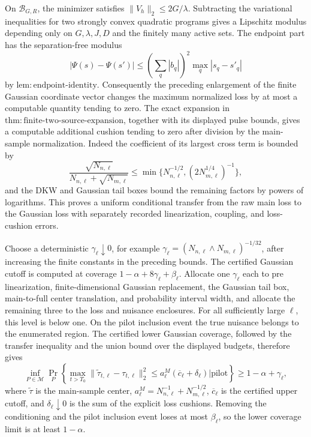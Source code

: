 On \(\mathcal B_{G,R}\), the minimizer satisfies
\(\|V_h\|_2\leq2G/\lambda\).  Subtracting the variational inequalities for two strongly convex quadratic programs gives a Lipschitz modulus depending only on \(G,\lambda,J,D\) and the finitely many active sets.  The endpoint part has the separation-free modulus
\[
 |\Psi(s)-\Psi(s')|
 \leq\left(\sum_q|b_q|\right)^2\max_q|s_q-s'_q|
\]
by \(\mathrm{lem:endpoint\mbox{-}identity}\).  Consequently the preceding enlargement of the finite Gaussian coordinate vector changes the maximum normalized loss by at most a computable quantity tending to zero.  The exact expansion in \(\mathrm{thm:finite\mbox{-}two\mbox{-}source\mbox{-}expansion}\), together with its displayed pulse bounds, gives a computable additional cushion tending to zero after division by the main-sample normalization.  Indeed the coefficient of its largest cross term is bounded by
\[
 \frac{\sqrt{N_{n,\ell}}}
 {N_{n,\ell}+\sqrt{N_{m,\ell}}}
 \leq \min\{N_{n,\ell}^{-1/2},(2N_{m,\ell}^{1/4})^{-1}\},
\]
and the DKW and Gaussian tail boxes bound the remaining factors by powers of logarithms.  This proves a uniform conditional transfer from the raw main loss to the Gaussian loss with separately recorded linearization, coupling, and loss-cushion errors.

Choose a deterministic \(\gamma_\ell\downarrow0\), for example
\(\gamma_\ell=(N_{n,\ell}\wedge N_{m,\ell})^{-1/32}\), after increasing the finite constants in the preceding bounds.  The certified Gaussian cutoff is computed at coverage
\(1-\alpha+8\gamma_\ell+\beta_\ell\).  Allocate one \(\gamma_\ell\) each to pre linearization, finite-dimensional Gaussian replacement, the Gaussian tail box, main-to-full center translation, and probability interval width, and allocate the remaining three to the loss and nuisance enclosures.  For all sufficiently large \(\ell\), this level is below one.  On the pilot inclusion event the true nuisance belongs to the enumerated region.  The certified lower Gaussian coverage, followed by the transfer inequality and the union bound over the displayed budgets, therefore gives
\[
 \inf_{P\in\mathcal M}
 \Pr_P\left\{
  \max_{t>T_0}\|\widetilde\tau_{t,\ell}-\tau_{t,\ell}\|_2^2
  \leq a^M_\ell(\overline c_\ell+\delta_\ell)
  \mathrel{\big|}\text{pilot}\right\}
 \geq1-\alpha+\gamma_\ell,
\]
where \(\widetilde\tau\) is the main-sample center, \(a^M_\ell=N_{n,\ell}^{-1}+N_{m,\ell}^{-1/2}\), \(\overline c_\ell\) is the certified upper cutoff, and \(\delta_\ell\downarrow0\) is the sum of the explicit loss cushions.  Removing the conditioning and the pilot inclusion event loses at most \(\beta_\ell\), so the lower coverage limit is at least \(1-\alpha\).

